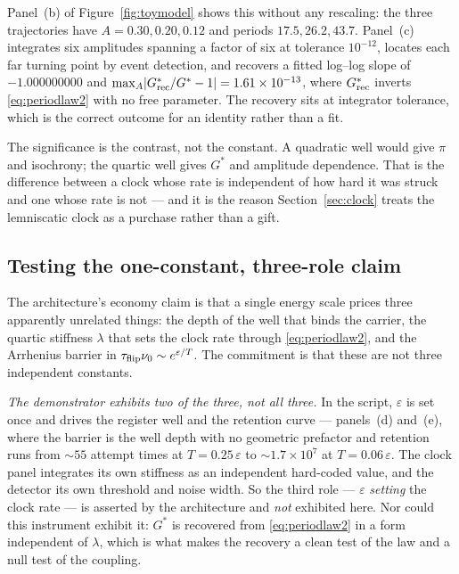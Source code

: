 \documentclass[11pt,a4paper]{article}
\newcommand{\Gstar}{{G^{*}}}
\theoremstyle{definition}
\theoremstyle{plain}
\theoremstyle{remark}
\begin{document}
Panel~(b) of Figure~\ref{fig:toymodel} shows this without any rescaling:
the three trajectories have $A = 0.30, 0.20, 0.12$ and periods
$17.5, 26.2, 43.7$. Panel~(c) integrates six amplitudes spanning a factor
of six at tolerance $10^{-12}$, locates each far turning point by event
detection, and recovers a fitted log--log slope of $-1.000000000$ and
$\max_{A}\lvert G^{*}_{\rm rec}/G^{*} - 1\rvert = 1.61\times10^{-13}$,
where $G^{*}_{\rm rec}$ inverts \eqref{eq:periodlaw2} with no free
parameter. The recovery sits at integrator tolerance, which is the correct
outcome for an identity rather than a fit.

The significance is the contrast, not the constant. A quadratic well
would give $\pi$ and isochrony; the quartic well gives $G^{*}$ and
amplitude dependence. That is the difference between a clock whose rate is
independent of how hard it was struck and one whose rate is not --- and it
is the reason Section~\ref{sec:clock} treats the lemniscatic clock as a
purchase rather than a gift.

\subsection{Testing the one-constant, three-role claim}

The architecture's economy claim is that a single energy scale prices
three apparently unrelated things: the depth of the well that binds the
carrier, the quartic stiffness $\lambda$ that sets the clock rate through
\eqref{eq:periodlaw2}, and the Arrhenius barrier in $\tau_{\rm
flip}\nu_{0}\sim e^{\varepsilon/T}$. The commitment is that these are not
three independent constants.

\emph{The demonstrator exhibits two of the three, not all three.} In the
script, $\varepsilon$ is set once and drives the register well and the
retention curve --- panels~(d) and~(e), where the barrier is the well
depth with no geometric prefactor and retention runs from $\sim\!55$
attempt times at $T = 0.25\,\varepsilon$ to $\sim\!1.7\times10^{7}$ at
$T = 0.06\,\varepsilon$. The clock panel integrates its own stiffness as
an independent hard-coded value, and the detector its own threshold and
noise width. So the third role --- $\varepsilon$ \emph{setting} the clock
rate --- is asserted by the architecture and \emph{not} exhibited here.
Nor could this instrument exhibit it: $\Gstar$ is recovered from
\eqref{eq:periodlaw2} in a form independent of $\lambda$, which is what
makes the recovery a clean test of the law and a null test of the
coupling.
\end{document}
